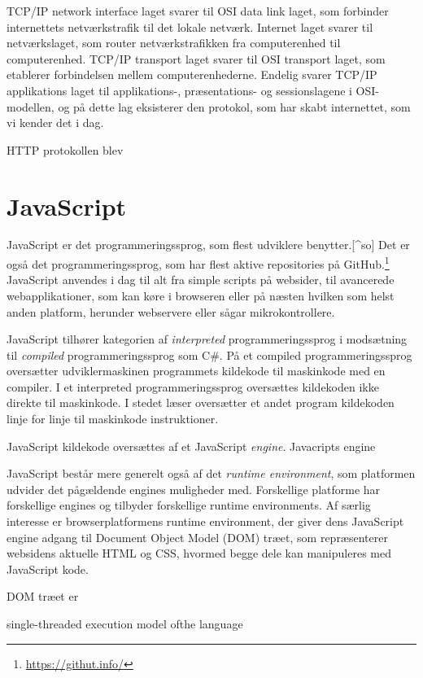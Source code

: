 \documentclass[]{article}
\begin{document}
TCP/IP network interface laget svarer til OSI data link laget, som
forbinder internettets netværkstrafik til det lokale netværk. Internet
laget svarer til netværkslaget, som router netværkstrafikken fra
computerenhed til computerenhed. TCP/IP transport laget svarer til OSI
transport laget, som etablerer forbindelsen mellem computerenhederne.
Endelig svarer TCP/IP applikations laget til applikations-,
præsentations- og sessionslagene i OSI-modellen, og på dette lag
eksisterer den protokol, som har skabt internettet, som vi kender det i
dag.

HTTP protokollen blev

\hypertarget{javascript}{%
\section{JavaScript}\label{javascript}}

JavaScript er det programmeringssprog, som flest udviklere
benytter.{[}\^{}so{]} Det er også det programmeringssprog, som har flest
aktive repositories på GitHub.\footnote{\url{https://githut.info/}}
JavaScript anvendes i dag til alt fra simple scripts på websider, til
avancerede webapplikationer, som kan køre i browseren eller på næsten
hvilken som helst anden platform, herunder webservere eller sågar
mikrokontrollere.

JavaScript tilhører kategorien af \emph{interpreted} programmeringssprog
i modsætning til \emph{compiled} programmeringssprog som C\#. På et
compiled programmeringssprog oversætter udviklermaskinen programmets
kildekode til maskinkode med en compiler. I et interpreted
programmeringssprog oversættes kildekoden ikke direkte til maskinkode. I
stedet læser oversætter et andet program kildekoden linje for linje til
maskinkode instruktioner.

JavaScript kildekode oversættes af et JavaScript \emph{engine}.
Javacripts engine

JavaScript består mere generelt også af det \emph{runtime environment},
som platformen udvider det pågældende engines muligheder med.
Forskellige platforme har forskellige engines og tilbyder forskellige
runtime environments. Af særlig interesse er browserplatformens runtime
environment, der giver dens JavaScript engine adgang til Document Object
Model (DOM) træet, som repræsenterer websidens aktuelle HTML og CSS,
hvormed begge dele kan manipuleres med JavaScript kode.

DOM træet er

single-threaded execution model ofthe language
\end{document}
